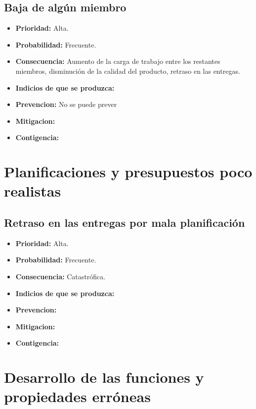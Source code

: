 \documentclass[spanish,a4paper,12pt]{report}	%
\begin{document}
\subsection*{Baja de algún miembro}			%
	\begin{itemize}
		\item \textbf {Prioridad: }Alta.
		\item \textbf {Probabilidad: }Frecuente.
		\item \textbf {Consecuencia: }Aumento de la carga de trabajo entre los restantes miembros, disminución de la calidad del producto, retraso en las entregas.
		\item \textbf {Indicios de que se produzca: }
		\item \textbf {Prevencion: }No se puede prever
		\item \textbf {Mitigacion: }
		\item \textbf {Contigencia: }
	\end{itemize}

%
\section{Planificaciones y presupuestos poco realistas}
\subsection*{Retraso en las entregas por mala planificación}			%
	\begin{itemize}
		\item \textbf {Prioridad: }Alta.
		\item \textbf {Probabilidad: }Frecuente.
		\item \textbf {Consecuencia: }Catastrófica.
		\item \textbf {Indicios de que se produzca: }
		\item \textbf {Prevencion: }
		\item \textbf {Mitigacion: }
		\item \textbf {Contigencia: }
	\end{itemize}

%
\section{Desarrollo de las funciones y propiedades erróneas}
\end{document}
